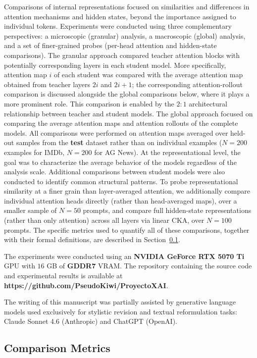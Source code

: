 \documentclass[conference]{IEEEtran}
\begin{document}
Comparisons of internal representations focused on similarities and differences in attention mechanisms and hidden states, beyond the importance assigned to individual tokens. Experiments were conducted using three complementary perspectives: a microscopic (granular) analysis, a macroscopic (global) analysis, and a set of finer-grained probes (per-head attention and hidden-state comparisons). The granular approach compared teacher attention blocks with potentially corresponding layers in each student model. More specifically, attention map $i$ of each student was compared with the average attention map obtained from teacher layers $2i$ and $2i+1$; the corresponding attention-rollout comparison is discussed alongside the global comparisons below, where it plays a more prominent role. This comparison is enabled by the $2:1$ architectural relationship between teacher and student models. The global approach focused on comparing the average attention maps and attention rollouts of the complete models. All comparisons were performed on attention maps averaged over held-out samples from the \textbf{test} dataset rather than on individual examples ($N=200$ examples for IMDb, $N=200$ for AG News). At the representational level, the goal was to characterize the average behavior of the models regardless of the analysis scale. Additional comparisons between student models were also conducted to identify common structural patterns. To probe representational similarity at a finer grain than layer-averaged attention, we additionally compare individual attention heads directly (rather than head-averaged maps), over a smaller sample of $N=50$ prompts, and compare full hidden-state representations (rather than only attention) across all layers via linear CKA, over $N=100$ prompts. The specific metrics used to quantify all of these comparisons, together with their formal definitions, are described in Section~\ref{sec:metrics}.

The experiments were conducted using an \textbf{NVIDIA GeForce RTX 5070 Ti} GPU with $16$ GB of \textbf{GDDR7} VRAM. The repository containing the source code and experimental results is available at \textbf{https://github.com/PseudoKiwi/ProyectoXAI}.

The writing of this manuscript was partially assisted by generative language models used exclusively for stylistic revision and textual reformulation tasks: Claude Sonnet 4.6 \cite{anthropic2025claude} (Anthropic) and ChatGPT \cite{openai_chatgpt} (OpenAI).

\subsection{Comparison Metrics}\label{sec:metrics}
\end{document}
